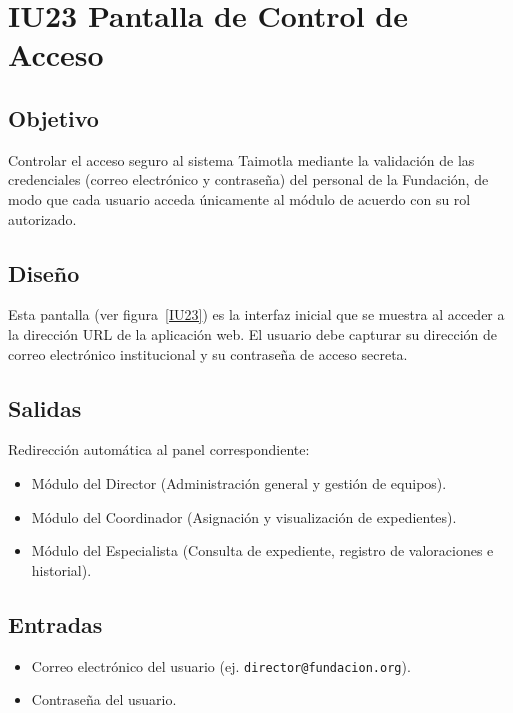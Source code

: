\section{IU23 Pantalla de Control de Acceso}

\subsection{Objetivo}
	Controlar el acceso seguro al sistema Taimotla mediante la validación de las credenciales (correo electrónico y contraseña) del personal de la Fundación, de modo que cada usuario acceda únicamente al módulo de acuerdo con su rol autorizado.

\subsection{Diseño}
	Esta pantalla  (ver figura~\ref{IU23}) es la interfaz inicial que se muestra al acceder a la dirección URL de la aplicación web. El usuario debe capturar su dirección de correo electrónico institucional y su contraseña de acceso secreta.


\subsection{Salidas}
	\begin{Citemize}
		\item Redirección automática al panel correspondiente:
			\begin{itemize}
				\item Módulo del Director (Administración general y gestión de equipos).
				\item Módulo del Coordinador (Asignación y visualización de expedientes).
				\item Módulo del Especialista (Consulta de expediente, registro de valoraciones e historial).
			\end{itemize}
	\end{Citemize}

\subsection{Entradas}
	\begin{itemize}
		\item Correo electrónico del usuario (ej. \texttt{director@fundacion.org}).
		\item Contraseña del usuario.
	\end{itemize}

